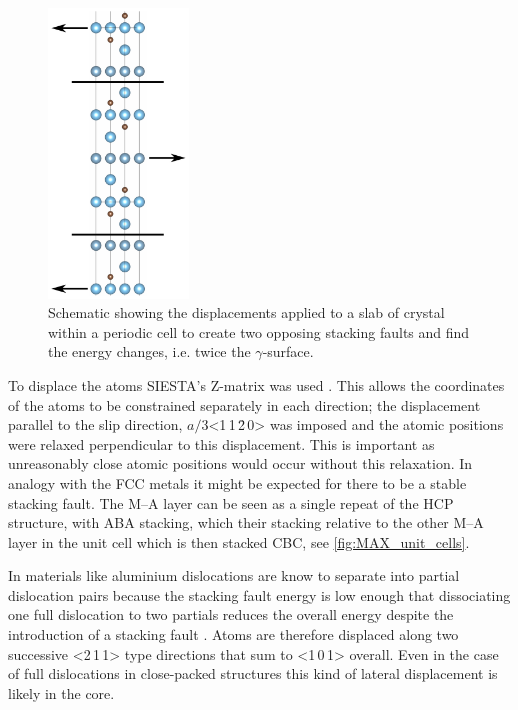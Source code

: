 \begin{figure}
\centering
\captionsetup{width=0.45\textwidth}
\includegraphics[width=0.3333\textwidth]{displacements_for_gamma_surface}
\caption[Schematic displacements during the simulation of the \texorpdfstring{$\gamma$}{gamma}-surface.]{Schematic showing the displacements applied to a slab of crystal within a periodic cell to create two opposing stacking faults and find the energy changes, i.e. twice the $\gamma$-surface. \label{fig:DFT_gamma_surface}}
\end{figure}

To displace the atoms SIESTA's Z-matrix was used \cite{SIESTA_manual}. This allows the coordinates of the atoms to be constrained separately in each direction; the displacement parallel to the slip direction, $a/3$<1\,1\,\={2}\,0> was imposed and the atomic positions were relaxed perpendicular to this displacement. This is important as unreasonably close atomic positions would occur without this relaxation. In analogy with the FCC metals it might be expected for there to be a stable stacking fault. The M--A layer can be seen as a single repeat of the HCP structure, with ABA stacking, which their stacking relative to the other M--A layer in the unit cell which is then stacked CBC, see \autoref{fig:MAX_unit_cells}. 

In materials like aluminium dislocations are know to separate into partial dislocation pairs because the stacking fault energy is low enough that dissociating one full dislocation to two partials reduces the overall energy despite the introduction of a stacking fault \cite{kelly2012ch9}. Atoms are therefore displaced along two successive <2\,1\,1> type directions that sum to <1\,0\,1> overall. Even in the case of full dislocations in close-packed structures this kind of lateral displacement is likely in the core. 

